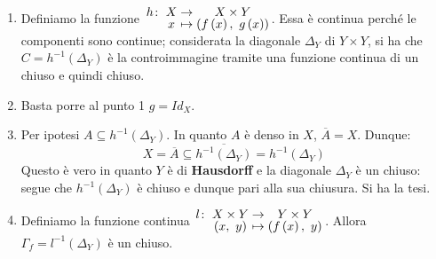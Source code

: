 \begin{demonstration}~{}
\begin{enumerate}[label=\Roman*]
\item Definiamo la funzione $\funztot{h}{X}{X\times Y}{x}{\left(f\left(x\right),\ g\left(x\right)\right)}$. Essa è continua perché le componenti sono continue; considerata la diagonale $\Delta_{Y}$ di $Y\times Y$, si ha che $C=h^{-1}\left(\Delta_Y\right)$ è la controimmagine tramite una funzione continua di un chiuso e quindi chiuso.
\item Basta porre al punto 1 $g=Id_{X}$.
\item Per ipotesi $A\subseteq h^{-1}\left(\Delta_Y\right)$. In quanto $A$ è denso in $X$, $\overline{A}=X$. Dunque:
\begin{equation*}
X=\overline{A}\subseteq\overline{h^{-1}\left(\Delta_Y\right)}=h^{-1}\left(\Delta_Y\right)
\end{equation*}
Questo è vero in quanto $Y$ è di \textbf{Hausdorff} e la diagonale $\Delta_Y$ è un chiuso: segue che $h^{-1}\left(\Delta_Y\right)$ è chiuso e dunque pari alla sua chiusura. Si ha la tesi.
\item Definiamo la funzione continua $\funztot{l}{X\times Y}{Y\times Y}{\left(x,\ y\right)}{\left(f\left(x\right),\ y\right)}$. Allora $\Gamma_f=l^{-1}\left(\Delta_Y\right)$ è un chiuso.
\end{enumerate}
\end{demonstration}
